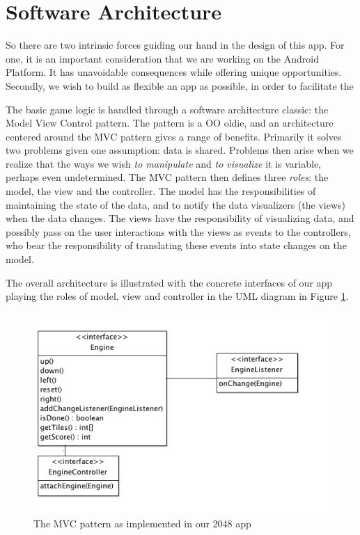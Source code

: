 \documentclass[a4paper, 12pt]{article}
\begin{document}
\section{Software Architecture}

So there are two intrinsic forces guiding our hand in the design of
this app. For one, it is an important consideration that we are
working on the Android Platform. It has unavoidable consequences while
offering unique opportunities. Secondly, we wish to build as flexible
an app as possible, in order to facilitate the 

The basic game logic is handled through a software architecture
classic: the Model View Control pattern. The pattern is a OO oldie,
and an architecture centered around the MVC pattern gives a range of
benefits. Primarily it solves two problems given one assumption: data
is shared. Problems then arise when we realize that the ways we wish
\emph{to manipulate} and \emph{to visualize} it is variable, perhaps
even undetermined. The MVC pattern then defines three \emph{roles}:
the model, the view and the controller. The model has the
responsibilities of maintaining the state of the data, and to notify
the data visualizers (the views) when the data changes. The views have
the responsibility of visualizing data, and possibly pass on the user
interactions with the views as events to the controllers, who bear the
responsibility of translating these events into state changes on the
model.

The overall architecture is illustrated with the concrete interfaces
of our app playing the roles of model, view and controller in the UML
diagram in Figure \ref{fig:mvc-1.png}.

\begin{figure}[!h]
  \includegraphics[width=\linewidth]{mvc-1.png}
  \caption{The MVC pattern as implemented in our 2048 app}
  \label{fig:mvc-1.png}
\end{figure}
\end{document}
